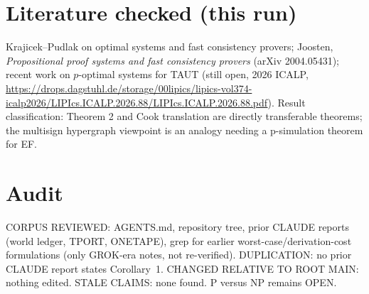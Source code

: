\documentclass[11pt]{article}
\begin{document}
\section{Literature checked (this run)}
Krajicek--Pudlak on optimal systems and fast consistency provers; Joosten, \emph{Propositional proof systems and fast consistency provers} (arXiv 2004.05431); recent work on $p$-optimal systems for TAUT (still open, 2026 ICALP, \url{https://drops.dagstuhl.de/storage/00lipics/lipics-vol374-icalp2026/LIPIcs.ICALP.2026.88/LIPIcs.ICALP.2026.88.pdf}). Result classification: Theorem 2 and Cook translation are directly transferable theorems; the multisign hypergraph viewpoint is an analogy needing a p-simulation theorem for EF.

\section{Audit}
CORPUS REVIEWED: AGENTS.md, repository tree, prior CLAUDE reports (world ledger, TPORT, ONETAPE), grep for earlier worst-case/derivation-cost formulations (only GROK-era notes, not re-verified). DUPLICATION: no prior CLAUDE report states Corollary~1. CHANGED RELATIVE TO ROOT MAIN: nothing edited. STALE CLAIMS: none found. P versus NP remains OPEN.
\end{document}

